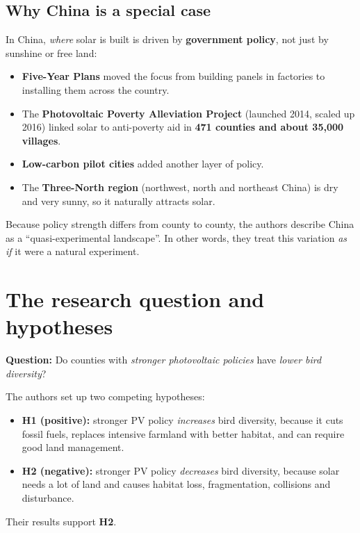 \documentclass[11pt]{article}
\begin{document}
\subsection{Why China is a special case}
In China, \emph{where} solar is built is driven by \textbf{government policy}, not just by sunshine or free land:
\begin{itemize}
\item \textbf{Five-Year Plans} moved the focus from building panels in factories to installing them across the country.
\item The \textbf{Photovoltaic Poverty Alleviation Project} (launched 2014, scaled up 2016) linked solar to anti-poverty aid in \textbf{471 counties and about 35,000 villages}.
\item \textbf{Low-carbon pilot cities} added another layer of policy.
\item The \textbf{Three-North region} (northwest, north and northeast China) is dry and very sunny, so it naturally attracts solar.
\end{itemize}
Because policy strength differs from county to county, the authors describe China as a ``quasi-experimental landscape''. In other words, they treat this variation \emph{as if} it were a natural experiment.

\section{The research question and hypotheses}

\textbf{Question:} Do counties with \emph{stronger photovoltaic policies} have \emph{lower bird diversity}?

The authors set up two competing hypotheses:
\begin{itemize}
\item \textbf{H1 (positive):} stronger PV policy \emph{increases} bird diversity, because it cuts fossil fuels, replaces intensive farmland with better habitat, and can require good land management.
\item \textbf{H2 (negative):} stronger PV policy \emph{decreases} bird diversity, because solar needs a lot of land and causes habitat loss, fragmentation, collisions and disturbance.
\end{itemize}
Their results support \textbf{H2}.
\end{document}
